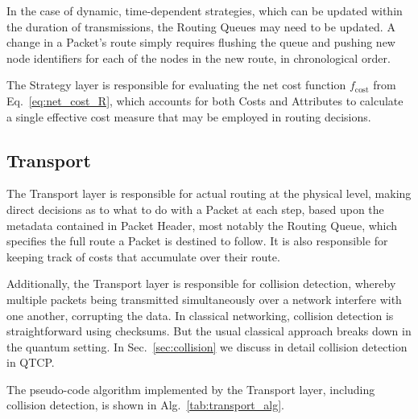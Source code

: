 \documentclass[aps,rmp,twocolumn,amsmath,amssymb,nofootinbib,superscriptaddress]{revtex4}
\begin{document}
In the case of dynamic, time-dependent strategies, which can be updated within the duration of transmissions, the {\sc Routing Queues} may need to be updated. A change in a {\sc Packet's} route simply requires flushing the queue and pushing new node identifiers for each of the nodes in the new route, in chronological order.

The {\sc Strategy} layer is responsible for evaluating the net cost function $f_\mathrm{cost}$ from Eq.~\ref{eq:net_cost_R}, which accounts for both {\sc Costs} and {\sc Attributes} to calculate a single effective cost measure that may be employed in routing decisions.

%
%

\subsection{Transport} \label{sec:transport}

The {\sc Transport} layer is responsible for actual routing at the physical level, making direct decisions as to what to do with a {\sc Packet} at each step, based upon the metadata contained in {\sc Packet Header}, most notably the {\sc Routing Queue}, which specifies the full route a {\sc Packet} is destined to follow. It is also responsible for keeping track of costs that accumulate over their route.

Additionally, the {\sc Transport} layer is responsible for collision detection, whereby multiple packets being transmitted simultaneously over a network interfere with one another, corrupting the data. In classical networking, collision detection is straightforward using checksums. But the usual classical approach breaks down in the quantum setting. In Sec.~\ref{sec:collision} we discuss in detail collision detection in QTCP.

The pseudo-code algorithm implemented by the {\sc Transport} layer, including collision detection, is shown in Alg.~\ref{tab:transport_alg}.
\end{document}
